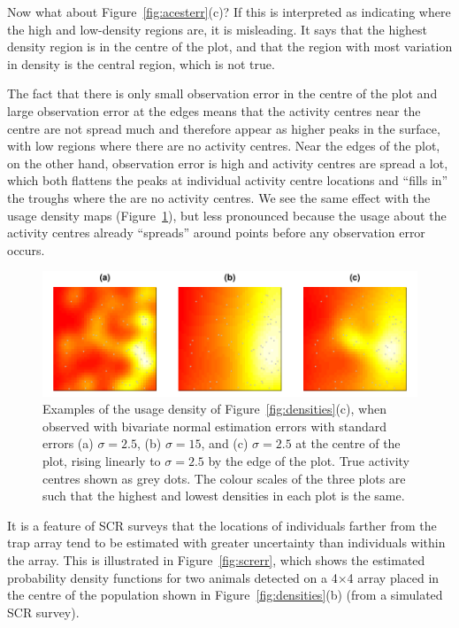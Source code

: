 \documentclass[10pt,a4paper]{article}
\begin{document}
Now what about Figure~\ref{fig:acesterr}(c)? If this is interpreted as indicating where the high and low-density regions are, it is misleading. It says that the highest density region is in the centre of the plot, and that the region with most variation in density is the central region, which is not true. 

The fact that there is only small observation error in the centre of the plot and large observation error at the edges means that the activity centres near the centre are not spread much and therefore appear as higher peaks in the surface, with low regions where there are no activity centres. Near the edges of the plot, on the other hand, observation error is high and activity centres are spread a lot, which both flattens the peaks at individual activity centre locations and ``fills in'' the troughs where the are no activity centres. We see the same effect with the usage density maps (Figure~\ref{fig:acuseesterr}), but less pronounced because the usage about the activity centres already ``spreads'' around points before any observation error occurs.

\begin{figure}[htbp]
\centering
\includegraphics[width=\textwidth]{acuseesterr.pdf}
\caption{Examples of the usage density of Figure~\ref{fig:densities}(c), when observed with bivariate normal estimation errors with standard errors (a) $\sigma=2.5$, (b) $\sigma=15$, and (c) $\sigma=2.5$ at the centre of the plot, rising linearly to $\sigma=2.5$ by the edge of the plot. True activity centres shown as grey dots. The colour scales of the three plots are such that the highest and lowest densities in each plot is the same.}
\label{fig:acuseesterr}
\end{figure}

It is a feature of SCR surveys that the locations of individuals farther from the trap array tend to be estimated with greater uncertainty than individuals within the array. This is illustrated in Figure~\ref{fig:screrr}, which shows the estimated probability density functions for two animals detected on a 4$\times$4 array placed in the centre of the population shown in Figure~\ref{fig:densities}(b) (from a simulated SCR survey).
\end{document}

